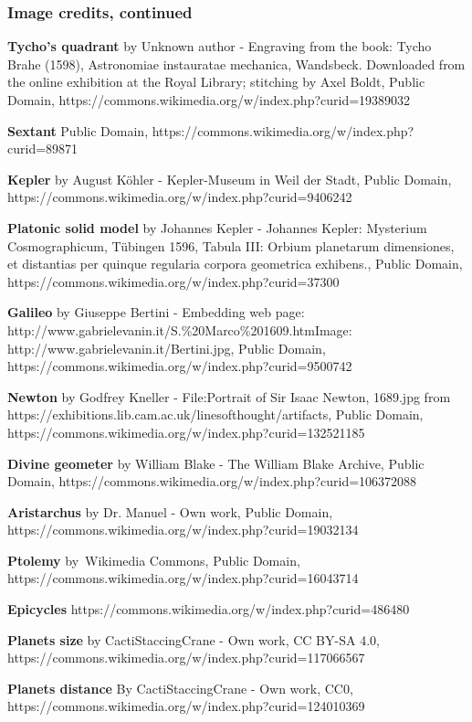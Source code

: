 \documentclass[aspectratio=169,xcolor=pdftex,dvipsnames]{beamer} %
\begin{document}
\begin{frame}
\frametitle{Image credits, continued}

\tiny{

\textbf{Tycho's quadrant} by Unknown author - Engraving from the book: Tycho Brahe (1598), Astronomiae instauratae mechanica, Wandsbeck. Downloaded from the online exhibition at the Royal Library; stitching by Axel Boldt, Public Domain, https://commons.wikimedia.org/w/index.php?curid=19389032

\textbf{Sextant} Public Domain, https://commons.wikimedia.org/w/index.php?curid=89871

\textbf{Kepler} by August Köhler - Kepler-Museum in Weil der Stadt, Public Domain, https://commons.wikimedia.org/w/index.php?curid=9406242

\textbf{Platonic solid model} by Johannes Kepler - Johannes Kepler: Mysterium Cosmographicum, Tübingen 1596, Tabula III: Orbium planetarum dimensiones, et distantias per quinque regularia corpora geometrica exhibens., Public Domain, https://commons.wikimedia.org/w/index.php?curid=37300

\textbf{Galileo} by Giuseppe Bertini - Embedding web page: http://www.gabrielevanin.it/S.\%20Marco\%201609.htmImage: http://www.gabrielevanin.it/Bertini.jpg, Public Domain, https://commons.wikimedia.org/w/index.php?curid=9500742

\textbf{Newton} by Godfrey Kneller - File:Portrait of Sir Isaac Newton, 1689.jpg from https://exhibitions.lib.cam.ac.uk/linesofthought/artifacts, Public Domain, https://commons.wikimedia.org/w/index.php?curid=132521185

\textbf{Divine geometer} by William Blake - The William Blake Archive, Public Domain, https://commons.wikimedia.org/w/index.php?curid=106372088

\textbf{Aristarchus} by Dr. Manuel - Own work, Public Domain, https://commons.wikimedia.org/w/index.php?curid=19032134

\textbf{Ptolemy} by Wikimedia Commons, Public Domain, https://commons.wikimedia.org/w/index.php?curid=16043714

\textbf{Epicycles} https://commons.wikimedia.org/w/index.php?curid=486480

\textbf{Planets size} by CactiStaccingCrane - Own work, CC BY-SA 4.0, https://commons.wikimedia.org/w/index.php?curid=117066567

\textbf{Planets distance} By CactiStaccingCrane - Own work, CC0, https://commons.wikimedia.org/w/index.php?curid=124010369

}
\end{frame}
\end{document}
